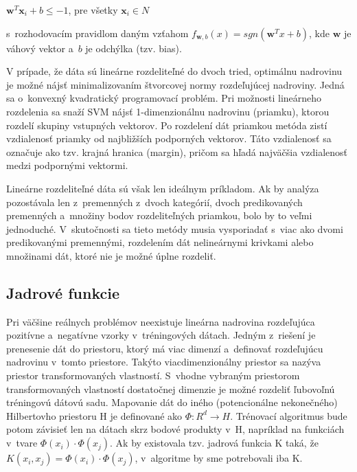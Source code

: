     $\textbf{w}^{T}\textbf{x}_{i} + b \leq -1$, pre všetky $\textbf{x}_{i} \in N$
    
s~rozhodovacím pravidlom daným vzťahom $f_{\textbf{w},b} ( x ) = sgn(\textbf{w}^{T}x + b )$, kde $\textbf{w}$ je váhový vektor a~$b$ je odchýlka (tzv. bias).

V prípade, že dáta sú lineárne rozdeliteľné do dvoch tried, optimálnu nadrovinu je možné nájsť minimalizovaním štvorcovej normy rozdeľujúcej nadroviny. Jedná sa o~konvexný kvadratický programovací problém.
Pri možnosti lineárneho rozdelenia sa snaží SVM nájsť 1-dimenzionálnu nadrovinu (priamku), ktorou rozdelí skupiny vstupných vektorov. Po rozdelení dát priamkou metóda zistí vzdialenosť priamky od najbližších podporných vektorov. Táto vzdialenosť sa označuje ako tzv. krajná hranica (margin), pričom sa hľadá najväčšia vzdialenosť medzi podpornými vektormi.  

Lineárne rozdeliteľné dáta sú však len ideálnym príkladom. Ak by analýza pozostávala len z~premenných z~dvoch kategórií, dvoch predikovaných premenných a~množiny bodov rozdeliteľných priamkou, bolo by to veľmi jednoduché. V~skutočnosti sa tieto metódy musia vysporiadať s~viac ako dvomi predikovanými premennými, rozdelením dát nelineárnymi krivkami alebo množinami dát, ktoré nie je možné úplne rozdeliť. 

\subsection{Jadrové funkcie}

Pri väčšine reálnych problémov neexistuje lineárna nadrovina rozdeľujúca pozitívne a~negatívne vzorky v~tréningových dátach. Jedným z~riešení je prenesenie dát do priestoru, ktorý má viac dimenzí a~definovať rozdeľujúcu nadrovinu v~tomto priestore. Takýto viacdimenzionálny priestor sa nazýva priestor transformovaných vlastností. S~vhodne vybraným priestorom transformovaných vlastností dostatočnej dimenzie je možné rozdeliť ľubovoľnú tréningovú dátovú sadu.
Mapovanie dát do iného (potencionálne nekonečného) Hilbertovho priestoru H je definované ako $\Phi:R^{d} \rightarrow H$. Trénovací algoritmus bude potom závisieť len na dátach skrz bodové produkty v~H, napríklad na funkciách v~tvare $\Phi(x_{i})\cdot\Phi(x_{j})$. Ak by existovala tzv. jadrová funkcia K taká, že $K(x_{i},x_{j}) = \Phi(x_{i})\cdot\Phi(x_{j})$, v~algoritme by sme potrebovali iba K. 

